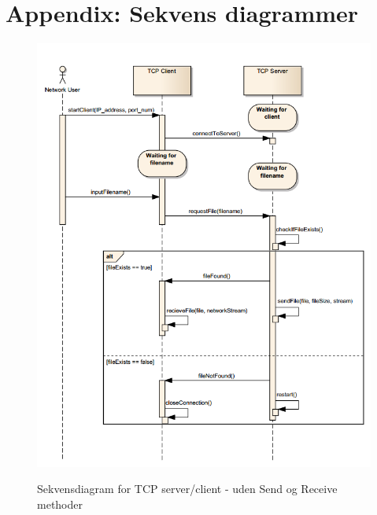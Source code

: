\appendix
\section{Appendix: Sekvens diagrammer}

\begin{figure}[h]
	\centering
	\caption{Sekvensdiagram for TCP server/client - uden Send og Receive methoder}
	\includegraphics[width=0.84\linewidth]{figs/sequence1.png}
	\label{fig:sequence1}
\end{figure}
